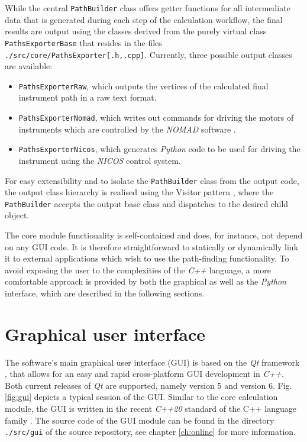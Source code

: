 While the central \lstinline[language=C++]|PathBuilder| class offers getter functions for all intermediate
data that is generated during each step of the calculation workflow, the final results are output using
the classes derived from the purely virtual class \lstinline[language=C++]|PathsExporterBase| that resides
in the files \lstinline|./src/core/PathsExporter[.h,.cpp]|. Currently, three possible output classes
are available:
\begin{itemize}
	\item \lstinline[language=C++]|PathsExporterRaw|, which outputs the vertices of the calculated 
		final instrument path in a raw text format.
	\item \lstinline[language=C++]|PathsExporterNomad|, which writes out commands for driving the
		motors of instruments which are controlled by the \textit{NOMAD} software \cite{web_NOMAD}.
	\item \lstinline[language=C++]|PathsExporterNicos|, which generates \textit{Python} code to
		be used for driving the instrument using the \textit{NICOS} \cite{web_NICOS} control system.
\end{itemize}
For easy extensibility and to isolate the \lstinline[language=C++]|PathBuilder| class from the output
code, the output class hierarchy is realised using the Visitor pattern \cite{wiki_visitor}, where
the \lstinline[language=C++]|PathBuilder| accepts the output base class and dispatches to the
desired child object.

The core module functionality is self-contained and does, for instance, not depend on any GUI code.
It is therefore straightforward to statically or dynamically link it to external applications which 
wish to use the path-finding functionality. To avoid exposing the user to the complexities of 
the \textit{C++} language, a more comfortable approach is provided by both the graphical as well 
as the \textit{Python} interface, which are described in the following sections.



\section{Graphical user interface}
\label{sec:gui}
The software's main graphical user interface (GUI) is based on the \textit{Qt} framework 
\cite{web_Qt}, that allows for an easy and rapid cross-platform GUI development in \textit{C++}. 
Both current releases of \textit{Qt} are supported, namely version 5 and version 6.
Fig. \ref{fig:gui} depicts a typical session of the GUI.
Similar to the core calculation module, the GUI is written in the recent \textit{C++20}
standard \cite{ISOCPP20} of the C++ language family \cite{Stroustrup2008, Stroustrup2018}.
The source code of the GUI module can be found in the directory \lstinline|./src/gui| of the
source repository, see chapter \ref{ch:online} for more information.

